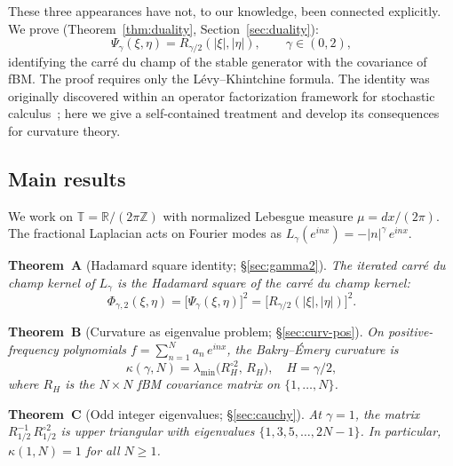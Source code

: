 \documentclass[11pt,a4paper]{article}
\theoremstyle{plain}
\theoremstyle{definition}
\theoremstyle{remark}
\newcommand{\R}{\mathbb{R}}
\newcommand{\Z}{\mathbb{Z}}
\newcommand{\T}{\mathbb{T}}
\begin{document}
These three appearances have not, to our knowledge, been connected
explicitly.  We prove (Theorem~\ref{thm:duality},
Section~\ref{sec:duality}):
\begin{equation}\label{eq:duality-intro}
  \Psi_\gamma(\xi,\eta) = R_{\gamma/2}(|\xi|,|\eta|),
  \qquad \gamma \in (0,2),
\end{equation}
identifying the carr\'e du champ of the stable generator with
the covariance of fBM.  The proof requires only the
L\'evy--Khintchine formula.
The identity was originally discovered within an operator
factorization framework for stochastic
calculus~\cite{Fontes2026a}; here we give a self-contained
treatment and develop its consequences for curvature theory.


\subsection{Main results}

We work on $\T = \R/(2\pi\Z)$ with normalized Lebesgue measure
$\mu = dx/(2\pi)$. The fractional Laplacian acts on Fourier modes as
$L_\gamma(e^{inx}) = -|n|^\gamma\,e^{inx}$.

\medskip\noindent
\textbf{Theorem~A} (Hadamard square identity; \S\ref{sec:gamma2}).
\emph{The iterated carr\'e du champ kernel of $L_\gamma$ is the
Hadamard square of the carr\'e du champ kernel:
\begin{equation}\label{eq:intro-A}
  \Phi_{\gamma,2}(\xi,\eta)
  = \bigl[\Psi_\gamma(\xi,\eta)\bigr]^2
  = \bigl[R_{\gamma/2}(|\xi|,|\eta|)\bigr]^2.
\end{equation}}

\medskip\noindent
\textbf{Theorem~B} (Curvature as eigenvalue problem; \S\ref{sec:curv-pos}).
\emph{On positive-frequency polynomials $f = \sum_{n=1}^N a_n\,e^{inx}$,
the Bakry--\'Emery curvature is
\begin{equation}\label{eq:intro-B}
  \kappa(\gamma, N) = \lambda_{\min}\!\bigl(R_H^{\circ 2},\, R_H\bigr),
  \quad H = \gamma/2,
\end{equation}
where $R_H$ is the $N \times N$ fBM covariance matrix on $\{1,\ldots,N\}$.}

\medskip\noindent
\textbf{Theorem~C} (Odd integer eigenvalues; \S\ref{sec:cauchy}).
\emph{At $\gamma = 1$, the matrix $R_{1/2}^{-1}\,R_{1/2}^{\circ 2}$ is
upper triangular with eigenvalues $\{1, 3, 5, \ldots, 2N-1\}$.
In particular, $\kappa(1,N) = 1$ for all $N \geq 1$.}
\end{document}
